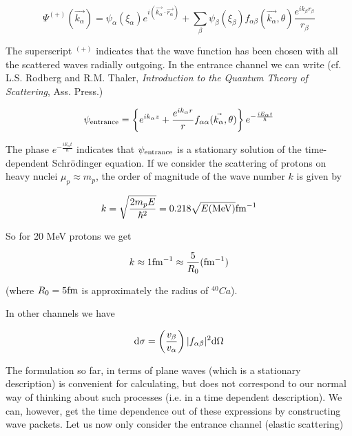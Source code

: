 \begin{equation}\label{eq2nd_2}
\Psi^{(+)}(\vec{k_{\alpha}}) = \psi_{\alpha}(\xi_{\alpha})e^{i(\vec{k_{\alpha}} \cdot \vec{r_{\alpha}})} + \sum_{\beta} \psi_{\beta} (\xi_{\beta}) f_{\alpha \beta}(\vec{k_{\alpha}},\theta) \frac{e^{i k_{\beta} r_{\beta}}}{r_{\beta}}
\end{equation}

\noindent The superscript $^{(+)}$ indicates that the wave function has been chosen with all the scattered waves radially outgoing. In the entrance channel we can write (cf. L.S. Rodberg and R.M. Thaler, {\it Introduction to the Quantum Theory of Scattering}, Ass. Press.)

\begin{equation}
\psi_{\rm entrance} = \left\{ e^{i k_{\alpha} z} + \frac{e^{i k_{\alpha} r}}{r} f_{\alpha \alpha}(\vec{k_{\alpha}}, \theta) \right\} e^{-\frac{i E_{\alpha} t}{\hbar}}
\end{equation}

\noindent The phase $e^{-\frac{i E_{\alpha} t}{\hbar}}$ indicates that $\psi_{\rm entrance}$ is a stationary solution of the time-dependent Schr\"odinger equation. If we consider the scattering of protons on heavy nuclei $\mu_p \approx m_p$, the order of magnitude of the wave number $k$ is given by

\begin{equation}
k = \sqrt{\frac{2 m_p E}{\hbar^2}} = 0.218 \sqrt{E({\rm MeV})} {\rm fm}^{-1}
\end{equation}

\noindent So for 20 MeV protons we get

\begin{equation}
k \approx 1 {\rm fm}^{-1} \approx \frac{5}{R_0} ({\rm fm}^{-1})
\end{equation}

 (where $R_0 = 5 {\rm fm}$ is approximately the radius of $^{40}Ca$).

In other channels we have

\begin{equation}\label{eq2nd_3}
{\rm d}\sigma = \left( \frac{v_{\beta}}{v_{\alpha}} \right) |f_{\alpha \beta}|^2 {\rm d}\Omega
\end{equation}

The formulation so far, in terms of plane waves (which is a stationary description) is convenient for calculating, but does not correspond to our normal way of thinking about such processes (i.e. in a time dependent description). We can, however, get the time dependence out of these expressions by constructing wave packets. Let us now only consider the entrance channel (elastic scattering)

